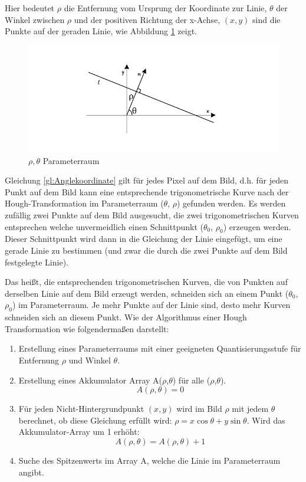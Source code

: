 Hier bedeutet $ \rho $ die Entfernung vom Ursprung der Koordinate zur Linie, $ \theta $ der Winkel zwischen $ \rho $ und der positiven Richtung der x-Achse, $ (x,y) $ sind die Punkte auf der geraden Linie, wie Abbildung \ref{fig:Hough} zeigt.

\begin{figure}[H]
 \centering 
  \includegraphics[keepaspectratio,width=1.0\textwidth]{images/4_ZweiteErfahrung/Hough/Hough.pdf}
 \caption{$ \rho,\theta $ Parameterraum}
 \label{fig:Hough}
\end{figure}

Gleichung \ref{gl:Anglekoordinate} gilt für jedes Pixel auf dem Bild, d.h. für jeden Punkt auf dem Bild kann eine entsprechende trigonometrische Kurve nach der Hough-Transformation im Parameterraum ($ \theta $, $ \rho $) gefunden werden. Es werden zufällig zwei Punkte auf dem Bild ausgesucht, die zwei  trigonometrischen Kurven entsprechen welche unvermeidlich einen Schnittpunkt ($ \theta_0 $, $ \rho_0 $) erzeugen werden. Dieser Schnittpunkt wird dann in die Gleichung der Linie eingefügt, um eine gerade Linie zu bestimmen (und zwar die durch die zwei Punkte auf dem Bild festgelegte Linie). 

Das heißt, die entsprechenden trigonometrischen Kurven, die von Punkten auf derselben Linie auf dem Bild erzeugt werden, schneiden sich an einem Punkt ($ \theta_0 $, $ \rho_0 $) im Parameterraum. Je mehr Punkte auf der Linie sind, desto mehr Kurven schneiden sich an diesem Punkt. Wie der Algorithmus einer Hough Transformation wie folgendermaßen darstellt:

\begin{enumerate}
\item Erstellung eines Parameterraums mit einer geeigneten Quantisierungsstufe für Entfernung $ \rho $ und Winkel $ \theta $.
\item Erstellung eines Akkumulator Array A($ \rho $,$ \theta $) für alle ($ \rho $,$ \theta $).
\begin{equation}
A(\rho,\theta) = 0
\end{equation}
\item Für jeden Nicht-Hintergrundpunkt $ (x,y) $ wird im Bild $ \rho $ mit jedem $ \theta $ berechnet, ob diese Gleichung erfüllt wird: $ \rho = x \cos \theta + y \sin \theta $. Wird das Akkumulator-Array um 1 erhöht: 
\begin{equation}
 A(\rho,\theta) = A(\rho,\theta) + 1 
\end{equation}
\item Suche des Spitzenwerts im Array A, welche die Linie im Parameterraum angibt.
\end{enumerate}

